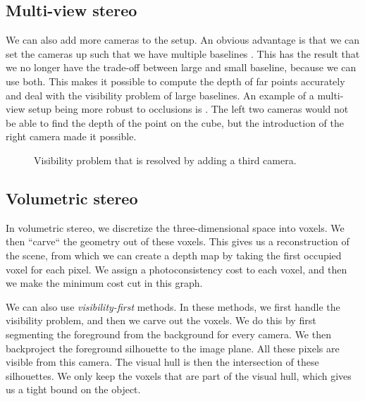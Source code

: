 
\subsection{Multi-view stereo}

We can also add more cameras to the setup. An obvious advantage is that we can
set the cameras up such that we have multiple baselines
\citep{okutomi1993multiple}. This has the result that we no longer have the
trade-off between large and small baseline, because we can use both. This makes
it possible to compute the depth of far points accurately and deal with the
visibility problem of large baselines. An example of a multi-view setup being
more robust to occlusions is . The left two
cameras would not be able to find the depth of the point on the cube, but the
introduction of the right camera made it possible.

\begin{figure}[t]
    \centering
    \caption{Visibility problem that is resolved by adding a third camera.}
    \label{fig:visibility-problem}
\end{figure}

\subsection{Volumetric stereo}

In volumetric stereo, we discretize the three-dimensional space into
voxels. We then ``carve``
the geometry out of these voxels. This gives us a reconstruction of the scene,
from which we can create a depth map by taking the first occupied voxel for
each pixel. We assign a photoconsistency cost to each voxel, and then we make
the minimum cost cut in this graph.


We can also use \textit{visibility-first} methods. In these methods, we first
handle the visibility problem, and then we carve out the voxels. We do this by
first segmenting the foreground from the background for every camera. We then
backproject the foreground silhouette to the image plane. All these pixels are
visible from this camera. The visual hull is then the intersection of these
silhouettes. We only keep the voxels that are part of the visual hull, which
gives us a tight bound on the object.

